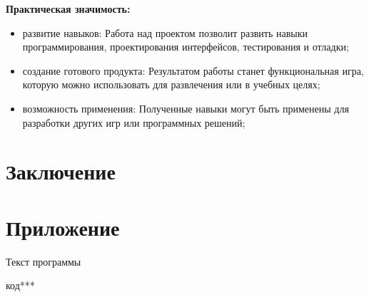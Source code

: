 \documentclass[14pt, oneside]{altsu-report}
\begin{document}
\textbf{Практическая значимость:}
\begin{itemize}
\item развитие навыков: Работа над проектом позволит развить навыки программирования, проектирования интерфейсов, тестирования и отладки;
\item создание готового продукта: Результатом работы станет функциональная игра, которую можно использовать для развлечения или в учебных целях;
\item возможность применения: Полученные навыки могут быть применены для разработки других игр или программных решений;
\end{itemize}




\chapter*{Заключение}

\newpage
{}
\printbibliography[title={Список использованной литературы}]
\nocite{*}

\appendix
\newpage
\chapter*{\raggedleft\label{appendix1}Приложение}

\begin{center}
\label{code:appendix}Текст программы
\end{center}

\begin{code}
код***
\end{code}
\end{document}
